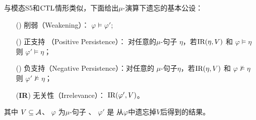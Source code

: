 与模态S5和$\textrm{CTL}$情形类似，下面给出$\mu$-演算下遗忘的基本公设：
\begin{itemize}
	\item[(\W)]  削弱（Weakening）： $\varphi \models \varphi'$;
	\item[(\PP)]  正支持 （Positive Persistence）：
	对任意的$\mu$-句子 $\eta$，若$\textrm{IR}(\eta, V)$ 和 $\varphi \models \eta$ 则 $\varphi' \models \eta$；
	\item[(\NgP)]  负支持（Negative Persistence）：对任意的 $\mu$-句子$\eta$，若$\textrm{IR}(\eta, V)$ 和 $\varphi \not \models \eta$ 则 $\varphi' \not \models \eta$；
	\item[(\textbf{IR})]  无关性（Irrelevance）： $\textrm{IR}(\varphi', V)$。
\end{itemize}
其中 $V\subseteq\cal A$、
$\varphi$ 为$\mu$-句子 、 $\varphi'$ 是 从$\varphi$中遗忘掉$V$后得到的结果。

